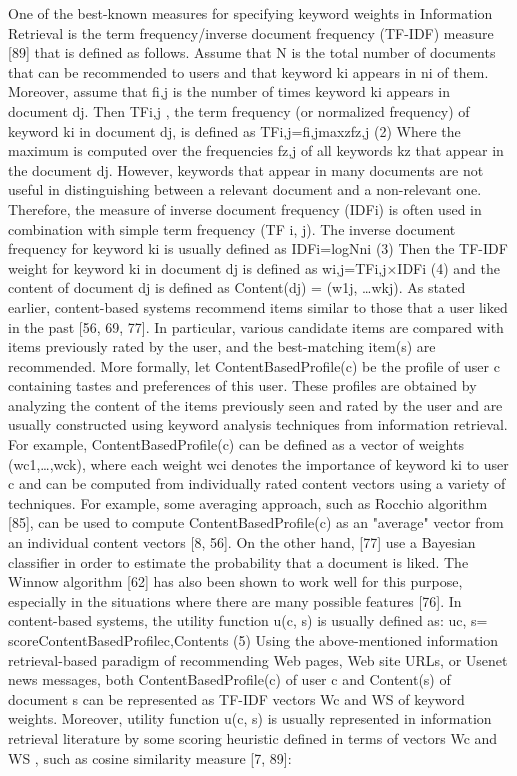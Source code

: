 One of the best-known measures for specifying keyword weights in Information Retrieval is the term frequency/inverse document frequency (TF-IDF) measure [89] that is defined as follows. Assume that N is the total number of documents that can be recommended to users and that keyword ki appears in ni of them. Moreover, assume that fi,j  is the number of times keyword ki appears in document dj. Then TFi,j , the term frequency (or normalized frequency) of keyword ki in document dj, is defined as
TFi,j=fi,jmaxzfz,j           (2)
Where the maximum is computed over the frequencies fz,j of all keywords kz that appear in the document dj. However, keywords that appear in many documents are not useful in distinguishing between a relevant document and a non-relevant one. Therefore, the measure of inverse document frequency (IDFi) is often used in combination with simple term frequency (TF i, j). The inverse document frequency for keyword ki is usually defined as
IDFi=logNni            (3)
Then the TF-IDF weight for keyword ki in document dj is defined as
wi,j=TFi,j×IDFi            (4)
and the content of document dj is defined as Content(dj) = (w1j, …wkj).
As stated earlier, content-based systems recommend items similar to those that a user liked in the past [56, 69, 77]. In particular, various candidate items are compared with items previously rated by the user, and the best-matching item(s) are recommended. More formally, let ContentBasedProfile(c) be the profile of user c containing tastes and preferences of this user. These profiles are obtained by analyzing the content of the items previously seen and rated by the user and are usually constructed using keyword analysis techniques from information retrieval. For example, ContentBasedProfile(c) can be defined as a vector of weights (wc1,…,wck), where each weight wci denotes the importance of keyword ki to user c and can be computed from individually rated content vectors using a variety of techniques. For example, some averaging approach, such as Rocchio algorithm [85], can be used to compute ContentBasedProfile(c) as an "average" vector from an individual content vectors [8, 56]. On the other hand, [77] use a Bayesian classifier in order to estimate the probability that a document is liked. The Winnow algorithm [62] has also been shown to work well for this purpose, especially in the situations where there are many possible features [76].
In content-based systems, the utility function u(c, s) is usually defined as:
uc, s= scoreContentBasedProfilec,Contents               (5)
Using the above-mentioned information retrieval-based paradigm of recommending Web pages, Web site URLs, or Usenet news messages, both ContentBasedProfile(c) of user c and Content(s) of document s can be represented as TF-IDF vectors Wc and WS of keyword weights. Moreover, utility function u(c, s) is usually represented in information retrieval literature by some scoring heuristic defined in terms of vectors Wc and WS , such as cosine similarity measure [7, 89]:
